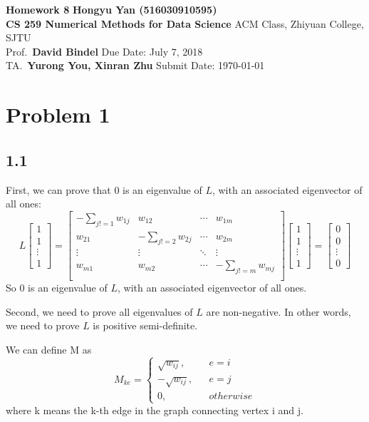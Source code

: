 \documentclass[a4paper, 11pt]{article}
\begin{document}
\noindent
\large\textbf{Homework 8} \hfill \textbf{Hongyu Yan (516030910595)} \\
\normalsize {\bf CS 259 Numerical Methods for Data Science} \hfill ACM Class, Zhiyuan College, SJTU\\
Prof.~{\bf David Bindel} \hfill Due Date: July 7, 2018\\
TA.~{\bf Yurong You, Xinran Zhu} \hfill Submit Date: \today

\section*{Problem 1}

\subsection*{1.1}
First, we can prove that 0 is an eigenvalue of $L$, with an associated eigenvector of all ones:
$$
L\begin{bmatrix}
1 \\ 1 \\ \vdots \\ 1
\end{bmatrix}
=
\begin{bmatrix}
-\sum_{j!=1}w_{1j} & w_{12} & \cdots & w_{1m} \\
w_{21} & -\sum_{j!=2}w_{2j} & \cdots & w_{2m} \\
\vdots & \vdots    &          \ddots & \vdots \\
w_{m1} & w_{m2} & \cdots & -\sum_{j!=m}w_{mj} \\
\end{bmatrix}
\begin{bmatrix}
1 \\ 1 \\ \vdots \\ 1
\end{bmatrix}
=
\begin{bmatrix}
0 \\ 0 \\ \vdots \\ 0
\end{bmatrix}
$$
So 0 is an eigenvalue of $L$, with an associated eigenvector of all ones.

Second, we need to prove all eigenvalues of $L$ are non-negative. In other words,
we need to prove $L$ is positive semi-definite.

We can define M as 
$$
M_{ke} = \left\{
\begin{aligned} 
\sqrt{w_{ij}}, &  & e = i \\
-\sqrt{w_{ij}}, &  & e = j \\
0, &  & otherwise
\end{aligned}
\right.
$$
where k means the k-th edge in the graph connecting vertex i and j.
\end{document}
